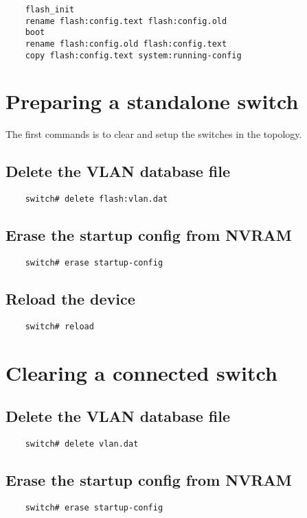 \documentclass{article}
\begin{document}
\begin{verbatim}
	flash_init
	rename flash:config.text flash:config.old
	boot
	rename flash:config.old flash:config.text
	copy flash:config.text system:running-config
\end{verbatim}

\section{Preparing a standalone switch}
The first commands is to clear and setup the switches in the topology.


\subsection{Delete the VLAN database file}
\begin{verbatim}
	switch# delete flash:vlan.dat
\end{verbatim}

\subsection{Erase the startup config from NVRAM}
\begin{verbatim}
	switch# erase startup-config
\end{verbatim}

\subsection{Reload the device}
\begin{verbatim}
	switch# reload
\end{verbatim}

\section{Clearing a connected switch}
\subsection{Delete the VLAN database file}
\begin{verbatim}
	switch# delete vlan.dat
\end{verbatim}

\subsection{Erase the startup config from NVRAM}
\begin{verbatim}
	switch# erase startup-config
\end{verbatim}
\end{document}
